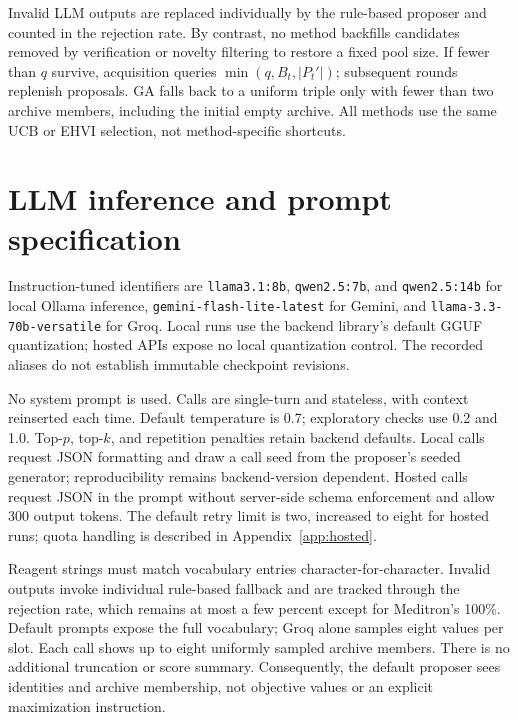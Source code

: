Invalid LLM outputs are replaced individually by the rule-based proposer and counted in the rejection rate. By contrast, no method backfills candidates removed by verification or novelty filtering to restore a fixed pool size. If fewer than $q$ survive, acquisition queries $\min(q,B_t,|P_t'|)$; subsequent rounds replenish proposals. GA falls back to a uniform triple only with fewer than two archive members, including the initial empty archive. All methods use the same UCB or EHVI selection, not method-specific shortcuts.

\section{LLM inference and prompt specification}
\label{app:llm-repro}
Instruction-tuned identifiers are \texttt{llama3.1:8b}, \texttt{qwen2.5:7b}, and \texttt{qwen2.5:14b} for local Ollama inference, \texttt{gemini-flash-lite-latest} for Gemini, and \texttt{llama-3.3-70b-versatile} for Groq. Local runs use the backend library's default GGUF quantization; hosted APIs expose no local quantization control. The recorded aliases do not establish immutable checkpoint revisions.

No system prompt is used. Calls are single-turn and stateless, with context reinserted each time. Default temperature is 0.7; exploratory checks use 0.2 and 1.0. Top-$p$, top-$k$, and repetition penalties retain backend defaults. Local calls request JSON formatting and draw a call seed from the proposer's seeded generator; reproducibility remains backend-version dependent. Hosted calls request JSON in the prompt without server-side schema enforcement and allow 300 output tokens. The default retry limit is two, increased to eight for hosted runs; quota handling is described in Appendix~\ref{app:hosted}.

Reagent strings must match vocabulary entries character-for-character. Invalid outputs invoke individual rule-based fallback and are tracked through the rejection rate, which remains at most a few percent except for Meditron's 100\%. Default prompts expose the full vocabulary; Groq alone samples eight values per slot. Each call shows up to eight uniformly sampled archive members. There is no additional truncation or score summary. Consequently, the default proposer sees identities and archive membership, not objective values or an explicit maximization instruction.

